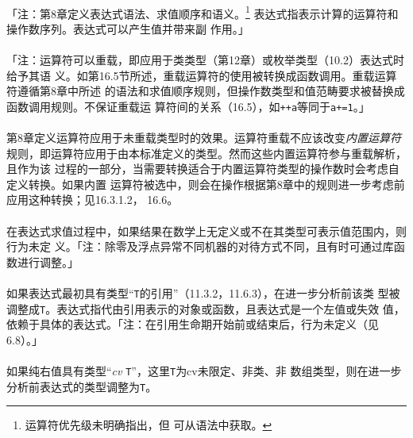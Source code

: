 
\paragraph{}
「注：第8章定义表达式语法、求值顺序和语义。\footnote{运算符优先级未明确指出，但
可从语法中获取。} 表达式指表示计算的运算符和操作数序列。表达式可以产生值并带来副
作用。」

\paragraph{}
「注：运算符可以重载，即应用于类类型（第12章）或枚举类型（10.2）表达式时给予其语
义。如第16.5节所述，重载运算符的使用被转换成函数调用。重载运算符遵循第8章中所述
的语法和求值顺序规则，但操作数类型和值范畴要求被替换成函数调用规则。不保证重载运
算符间的关系（16.5），如\texttt{++a}等同于\texttt{a+=1}。」

\paragraph{}
第8章定义运算符应用于未重载类型时的效果。运算符重载不应该改变\textit{内置运算符}
规则，即运算符应用于由本标准定义的类型。然而这些内置运算符参与重载解析，且作为该
过程的一部分，当需要转换适合于内置运算符类型的操作数时会考虑自定义转换。如果内置
运算符被选中，则会在操作根据第8章中的规则进一步考虑前应用这种转换；见16.3.1.2，
16.6。

\paragraph{}
在表达式求值过程中，如果结果在数学上无定义或不在其类型可表示值范围内，则行为未定
义。「注：除零及浮点异常不同机器的对待方式不同，且有时可通过库函数进行调整。」

\paragraph{}
如果表达式最初具有类型``\texttt{T}的引用''（11.3.2，11.6.3），在进一步分析前该类
型被调整成\texttt{T}。表达式指代由引用表示的对象或函数，且表达式是一个左值或失效
值，依赖于具体的表达式。「注：在引用生命期开始前或结束后，行为未定义（见6.8）。」

\paragraph{}
如果纯右值具有类型``\textit{cv} \texttt{T}''，这里\texttt{T}为cv未限定、非类、非
数组类型，则在进一步分析前表达式的类型调整为\texttt{T}。


